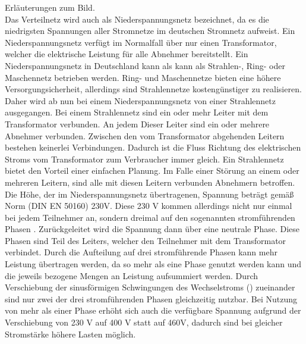 Erläuterungen zum Bild. \\
Das Verteilnetz wird auch als Niederspannungsnetz bezeichnet, da es die niedrigsten Spannungen aller Stromnetze im deutschen Stromnetz aufweist. Ein Niederspannungsnetz verfügt im Normalfall über nur einen Transformator, welcher die elektrische Leistung für alle Abnehmer bereitstellt. Ein Niederspannungsnetz in Deutschland kann als kann als Strahlen-, Ring- oder Maschennetz betrieben werden. Ring- und Maschennetze bieten eine höhere Versorgungsicherheit, allerdings sind Strahlennetze kostengünstiger zu realisieren. Daher wird ab nun bei einem Niederspannungsnetz von einer Strahlennetz ausgegangen. Bei einem Strahlennetz sind ein oder mehr Leiter mit dem Transformator verbunden. An jedem Dieser Leiter sind ein oder mehrere Abnehmer verbunden. Zwischen den vom Transformator abgehenden Leitern bestehen keinerlei Verbindungen. Dadurch ist die Fluss Richtung des elektrischen Stroms vom Transformator zum Verbraucher immer gleich. Ein Strahlennetz bietet den Vorteil einer einfachen Planung. Im Falle einer Störung an einem oder mehreren Leitern, sind alle mit diesen Leitern verbunden Abnehmern betroffen.\\
Die Höhe, der im Niederspannungsnetz übertragenen, Spannung beträgt gemäß Norm (DIN EN 50160) 230V.  Diese 230 V kommen allerdings nicht nur einmal bei jedem Teilnehmer an, sondern dreimal auf den sogenannten stromführenden Phasen \cite{strom_phasen}. Zurückgeleitet wird die Spannung dann über eine neutrale Phase. Diese Phasen sind Teil des Leiters, welcher den Teilnehmer mit dem Transformator verbindet. Durch die Aufteilung auf drei stromführende Phasen kann mehr Leistung übertragen werden, da so mehr als eine Phase genutzt werden kann und die jeweils bezogene Mengen an Leistung aufsummiert werden. Durch Verschiebung der sinusförmigen Schwingungen des Wechselstroms (\cite{strom_phasen}) zueinander sind nur zwei der drei stromführenden Phasen gleichzeitig nutzbar. Bei Nutzung von mehr als einer Phase erhöht sich auch die verfügbare Spannung aufgrund der Verschiebung von 230 V auf 400 V statt auf 460V, dadurch sind bei gleicher Stromstärke höhere Lasten möglich.



